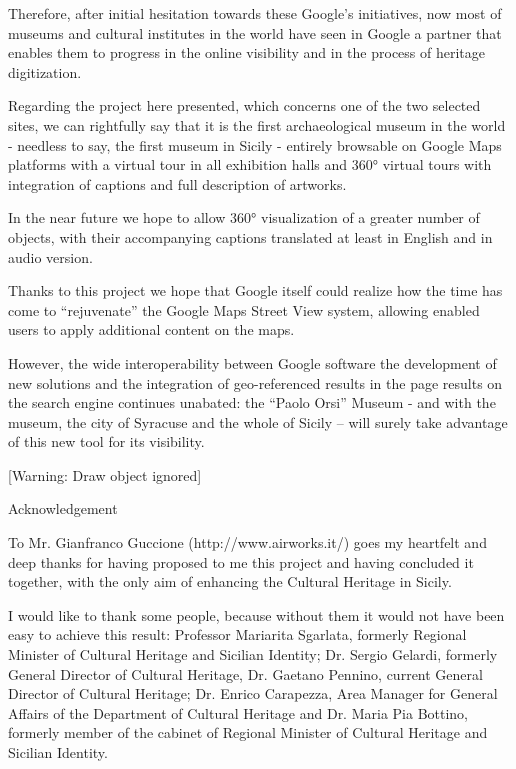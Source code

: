 \documentclass[amsthm,ebook]{saparticle}
\begin{document}
Therefore, after initial hesitation towards these Google’s initiatives, now most of museums and cultural institutes in
the world have seen in Google a partner that enables them to progress in the online visibility and in the process of
heritage digitization.

Regarding the project here presented, which concerns one of the two selected sites, we can rightfully say that it is the
first archaeological museum in the world - needless to say, the first museum in Sicily - entirely browsable on Google
Maps platforms with a virtual tour in all exhibition halls and 360° virtual tours with integration of captions and full
description of artworks.

In the near future we hope to allow 360° visualization of a greater number of objects, with their accompanying captions
translated at least in English and in audio version.

Thanks to this project we hope that Google itself could realize how the time has come to “rejuvenate” the Google Maps
Street View system, allowing enabled users to apply additional content on the maps.

However, the wide interoperability between Google software the development of new solutions and the integration of
geo-referenced results in the page results on the search engine continues unabated: the “Paolo Orsi” Museum - and with
the museum, the city of Syracuse and the whole of Sicily – will surely take advantage of this new tool for its
visibility.


\bigskip

[Warning: Draw object ignored]


\bigskip


Acknowledgement

To Mr. Gianfranco Guccione (http://www.airworks.it/) goes my heartfelt and deep thanks for having proposed to me this
project and having concluded it together, with the only aim of enhancing the Cultural Heritage in Sicily.

I would like to thank some people, because without them it would not have been easy to achieve this result: Professor
Mariarita Sgarlata, formerly Regional Minister of Cultural Heritage and Sicilian Identity; Dr. Sergio Gelardi, formerly
General Director of Cultural Heritage, Dr. Gaetano Pennino, current General Director of Cultural Heritage; Dr. Enrico
Carapezza, Area Manager for General Affairs of the Department of Cultural Heritage and Dr. Maria Pia Bottino, formerly
member of the cabinet of Regional Minister of Cultural Heritage and Sicilian Identity.
\end{document}
